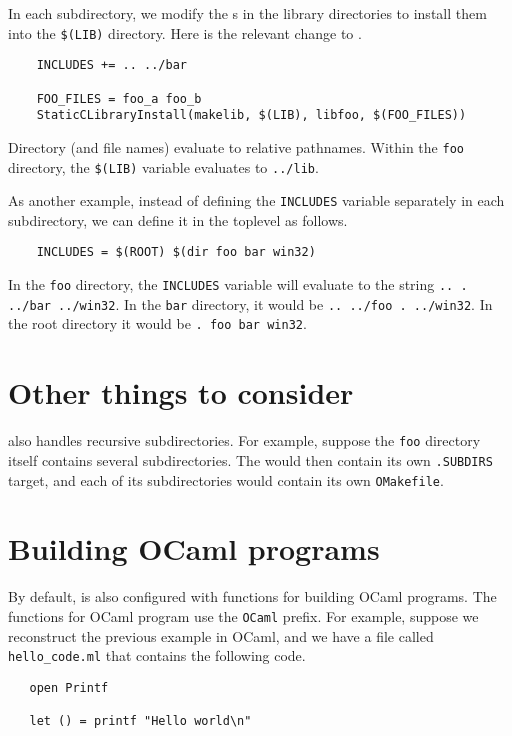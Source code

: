 In each subdirectory, we modify the s in the library directories to install them
into the \verb+$(LIB)+ directory.  Here is the relevant change to .

\begin{verbatim}
    INCLUDES += .. ../bar

    FOO_FILES = foo_a foo_b
    StaticCLibraryInstall(makelib, $(LIB), libfoo, $(FOO_FILES))
\end{verbatim}

Directory (and file names) evaluate to relative pathnames.  Within the \verb+foo+ directory, the
\verb+$(LIB)+ variable evaluates to \verb+../lib+.

As another example, instead of defining the \verb+INCLUDES+ variable separately
in each subdirectory, we can define it in the toplevel as follows.

\begin{verbatim}
    INCLUDES = $(ROOT) $(dir foo bar win32)
\end{verbatim}

In the \verb+foo+ directory, the \verb+INCLUDES+ variable will evaluate to
the string \verb+.. . ../bar ../win32+.  In the \verb+bar+ directory,
it would be \verb+.. ../foo . ../win32+.  In the root directory it
would be \verb+. foo bar win32+.

\section{Other things to consider}

 also handles recursive subdirectories.  For example, suppose the \verb+foo+
directory itself contains several subdirectories.  The  would then
contain its own \verb+.SUBDIRS+ target, and each of its subdirectories would
contain its own \verb+OMakefile+.

\section{Building OCaml programs}

By default,  is also configured with functions for building OCaml programs.
The functions for OCaml program use the \verb+OCaml+ prefix.  For example, suppose
we reconstruct the previous example in OCaml, and we have a file called \verb+hello_code.ml+
that contains the following code.

\begin{verbatim}
   open Printf

   let () = printf "Hello world\n"
\end{verbatim}


